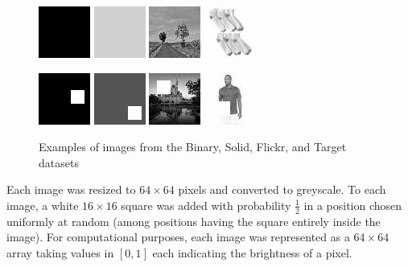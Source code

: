 \documentclass{article}
\newcommand{\dataset}[1]{\textsf{#1}}
\begin{document}
  \begin{figure}
    \centering
      \includegraphics{img/black}\quad
      \includegraphics{img/solid}\quad
      \includegraphics{img/flickr}\quad
      \includegraphics{img/target}\bigskip

      \includegraphics{img/black+rect}\quad
      \includegraphics{img/solid+rect}\quad
      \includegraphics{img/flickr+rect}\quad
      \includegraphics{img/target+rect}
      \caption{Examples of images from the \dataset{Binary}, \dataset{Solid}, \dataset{Flickr}, and \dataset{Target} datasets}
  \end{figure}

  Each image was resized to $64\times 64$ pixels and converted to greyscale. To each image, a white $16\times 16$ square was added with probability $\frac{1}{2}$ in a position chosen uniformly at random (among positions having the square entirely inside the image). For computational purposes, each image was represented as a $64\times 64$ array taking values in $[0, 1]$ each indicating the brightness of a pixel.
\end{document}
